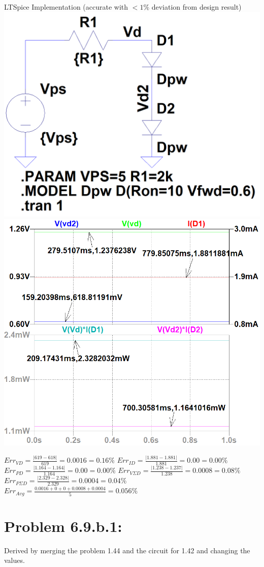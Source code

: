 \documentclass[12pt,letterpaper,titlepage]{article}
\begin{document}
\begin{raggedright}
\begin{center}
LTSpice Implementation (accurate with $< 1\%$ deviation from design result)
\includegraphics[width=.39\textwidth, height=\textheight, keepaspectratio=true]{ds1b}
\includegraphics[width=.6\textwidth, height=\textheight, keepaspectratio=true]{ds1c}
\begin{paracol}{2}
$Err_{VD} = \frac{|619-618|}{619} = 0.0016 = 0.16\%$
\switchcolumn
$Err_{ID} = \frac{|1.881-1.881|}{1.881} = 0.00 = 0.00\%$
\switchcolumn
$Err_{PD} = \frac{|1.164-1.164|}{1.164} = 0.00 = 0.00\%$
\switchcolumn
$Err_{V\Sigma D} = \frac{|1.238-1.237|}{1.238} = 0.0008 = 0.08\%$
\switchcolumn
$Err_{P\Sigma D} = \frac{|2.329-2.328|}{2.329} = 0.0004 = 0.04\%$
\switchcolumn
$Err_{Avg} = \frac{0.0016 + 0 + 0 + 0.0008 + 0.0004}{5} = 0.056\%$
\end{paracol}
\end{center}

\clearpage
\section{Problem 6.9.b.1: } Derived by merging the problem 1.44 and the circuit for 1.42 and changing the values.

\end{raggedright}
\end{document}
